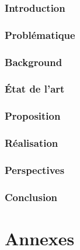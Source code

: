 \documentclass[french, 12pt]{article} %
\begin{document}
	\section{Introduction}
	 
	
	\newpage
	\section{Problématique}
	
	
	\newpage
	\section{Background}
	
	
	\newpage
	\section{État de l'art}
	
	
	
	
	
	
	\newpage
	\section{Proposition}
	
	
	\newpage
	\section{Réalisation}
	
	
	\newpage
	\section{Perspectives}
	
	
	\newpage
	\section{Conclusion}
	
	
	\newpage
	\printglossaries

	\newpage
	

\newpage
\part{Annexes} \appendix
	
\end{document}
